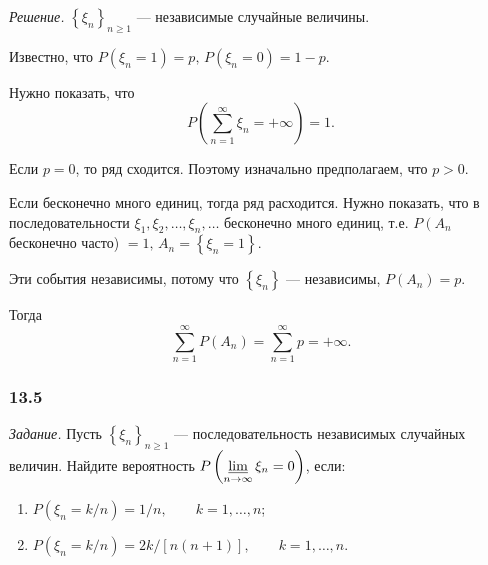 \textit{Решение.} $ \left\{ \xi_n \right\}_{n \geq 1}$ --- независимые случайные величины.

Известно, что $P \left( \xi_n = 1 \right) = p, \, P \left( \xi_n = 0 \right) = 1 - p$.

Нужно показать, что
$$P \left( \sum \limits_{n=1}^{ \infty } \xi_n = + \infty \right) = 1.$$

Если $p = 0$, то ряд сходится.
Поэтому изначально предполагаем, что $p > 0$.

Если бесконечно много единиц, тогда ряд расходится.
Нужно показать,
что в последовательности $ \xi_1, \xi_2, \dotsc, \xi_n, \dotsc $ бесконечно много единиц,
т.е. $P \left( A_n \right.$ бесконечно часто) $= 1, \, A_n = \left\{ \xi_n = 1 \right\} $.

Эти события независимы, потому что $ \left\{ \xi_n \right\} $ --- независимы, $P \left( A_n \right) = p$.

Тогда
$$ \sum \limits_{n=1}^{ \infty } P \left( A_n \right) =
\sum \limits_{n=1}^{ \infty } p =
+ \infty.$$

\subsubsection*{13.5}

\textit{Задание.} Пусть $ \left\{ \xi_n \right\}_{n \geq 1}$ --- последовательность независимых случайных величин.
Найдите вероятность $P \left( \varliminf \limits_{n \to \infty } \xi_n = 0 \right) $, если:
\begin{enumerate}[label=\alph*)]
\item $P \left( \xi_n = k/n \right) = 1/n, \qquad k = 1, \dotsc, n$;
\item $P \left( \xi_n = k/n \right) = 2k/\left[ n \left( n+1 \right) \right], \qquad k = 1, \dotsc, n$.
\end{enumerate}

